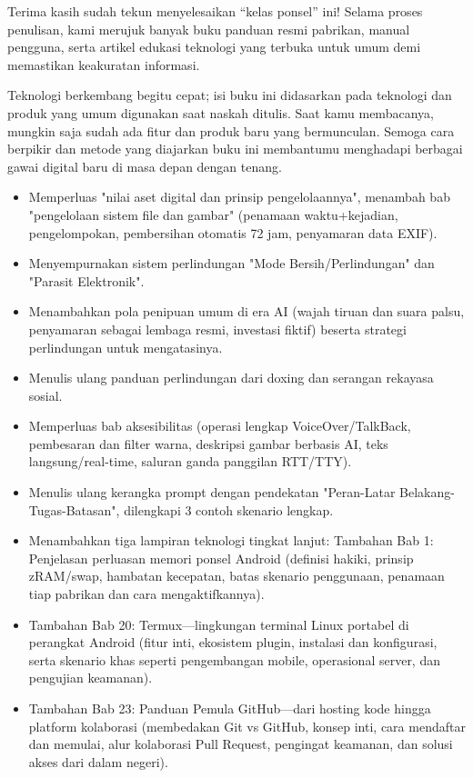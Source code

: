
Terima kasih sudah tekun menyelesaikan “kelas ponsel” ini! Selama proses penulisan, kami merujuk banyak buku panduan resmi pabrikan, manual pengguna, serta artikel edukasi teknologi yang terbuka untuk umum demi memastikan keakuratan informasi.

Teknologi berkembang begitu cepat; isi buku ini didasarkan pada teknologi dan produk yang umum digunakan saat naskah ditulis. Saat kamu membacanya, mungkin saja sudah ada fitur dan produk baru yang bermunculan. Semoga cara berpikir dan metode yang diajarkan buku ini membantumu menghadapi berbagai gawai digital baru di masa depan dengan tenang.


\begin{itemize}
  \item Memperluas "nilai aset digital dan prinsip pengelolaannya", menambah bab "pengelolaan sistem file dan gambar" (penamaan waktu+kejadian, pengelompokan, pembersihan otomatis 72 jam, penyamaran data EXIF).
  \item Menyempurnakan sistem perlindungan "Mode Bersih/Perlindungan" dan "Parasit Elektronik".
  \item Menambahkan pola penipuan umum di era AI (wajah tiruan dan suara palsu, penyamaran sebagai lembaga resmi, investasi fiktif) beserta strategi perlindungan untuk mengatasinya.
  \item Menulis ulang panduan perlindungan dari doxing dan serangan rekayasa sosial.
  \item Memperluas bab aksesibilitas (operasi lengkap VoiceOver/TalkBack, pembesaran dan filter warna, deskripsi gambar berbasis AI, teks langsung/real-time, saluran ganda panggilan RTT/TTY).
  \item Menulis ulang kerangka prompt dengan pendekatan "Peran-Latar Belakang-Tugas-Batasan", dilengkapi 3 contoh skenario lengkap.
  \item Menambahkan tiga lampiran teknologi tingkat lanjut: Tambahan Bab 1: Penjelasan perluasan memori ponsel Android (definisi hakiki, prinsip zRAM/swap, hambatan kecepatan, batas skenario penggunaan, penamaan tiap pabrikan dan cara mengaktifkannya).
  \item Tambahan Bab 20: Termux—lingkungan terminal Linux portabel di perangkat Android (fitur inti, ekosistem plugin, instalasi dan konfigurasi, serta skenario khas seperti pengembangan mobile, operasional server, dan pengujian keamanan).
  \item Tambahan Bab 23: Panduan Pemula GitHub—dari hosting kode hingga platform kolaborasi (membedakan Git vs GitHub, konsep inti, cara mendaftar dan memulai, alur kolaborasi Pull Request, pengingat keamanan, dan solusi akses dari dalam negeri).
\end{itemize}

